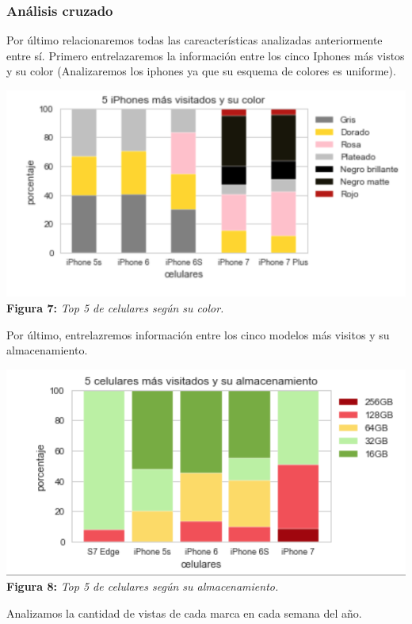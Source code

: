 \documentclass[titlepage,a4paper]{article}
\begin{document}
	\subsubsection{Análisis cruzado}
	Por último relacionaremos todas las careacterísticas analizadas anteriormente entre sí. Primero entrelazaremos la información entre los cinco Iphones más vistos y su color (Analizaremos los iphones ya que su esquema de colores es uniforme). 

	\begin{center}
	\includegraphics[width=15cm]{cincoModMasVisitadosColor.jpg}\\
	\textbf{Figura 7:}  \textit{Top 5 de celulares según su color. }
	\end{center}
	Por último, entrelazremos información entre los cinco modelos más visitos y su almacenamiento. 
	\begin{center}
	\includegraphics[width=15cm] {cincoModMasVisitadosAlmacenamiento.jpg}\\
	\textbf{Figura 8:}  \textit{Top 5 de celulares según su almacenamiento. }
	\end{center}
	Analizamos la cantidad de vistas de cada marca en cada semana del año.
\end{document}
